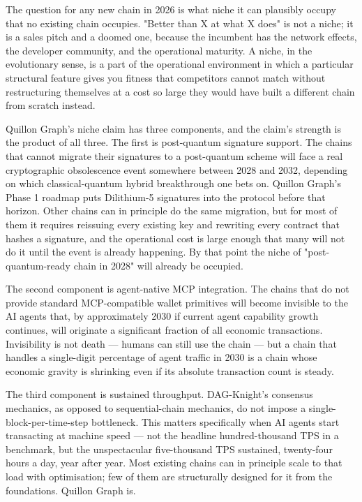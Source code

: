 \documentclass[11pt,a4paper]{article}
\begin{document}
The question for any new chain in 2026 is what niche it can plausibly
occupy that no existing chain occupies. "Better than X at what X does"
is not a niche; it is a sales pitch and a doomed one, because the
incumbent has the network effects, the developer community, and the
operational maturity. A niche, in the evolutionary sense, is a part of
the operational environment in which a particular structural feature
gives you fitness that competitors cannot match without restructuring
themselves at a cost so large they would have built a different chain
from scratch instead.

Quillon Graph's niche claim has three components, and the claim's
strength is the product of all three. The first is post-quantum
signature support. The chains that cannot migrate their signatures to a
post-quantum scheme will face a real cryptographic obsolescence event
somewhere between 2028 and 2032, depending on which classical-quantum
hybrid breakthrough one bets on. Quillon Graph's Phase 1 roadmap puts
Dilithium-5 signatures into the protocol before that horizon. Other
chains can in principle do the same migration, but for most of them it
requires reissuing every existing key and rewriting every contract that
hashes a signature, and the operational cost is large enough that many
will not do it until the event is already happening. By that point the
niche of "post-quantum-ready chain in 2028" will already be occupied.

The second component is agent-native MCP integration. The chains that do
not provide standard MCP-compatible wallet primitives will become
invisible to the AI agents that, by approximately 2030 if current agent
capability growth continues, will originate a significant fraction of
all economic transactions. Invisibility is not death --- humans can
still use the chain --- but a chain that handles a single-digit
percentage of agent traffic in 2030 is a chain whose economic gravity is
shrinking even if its absolute transaction count is steady.

The third component is sustained throughput. DAG-Knight's consensus
mechanics, as opposed to sequential-chain mechanics, do not impose a
single-block-per-time-step bottleneck. This matters specifically when AI
agents start transacting at machine speed --- not the headline
hundred-thousand TPS in a benchmark, but the unspectacular five-thousand
TPS sustained, twenty-four hours a day, year after year. Most existing
chains can in principle scale to that load with optimisation; few of
them are structurally designed for it from the foundations. Quillon
Graph is.
\end{document}
